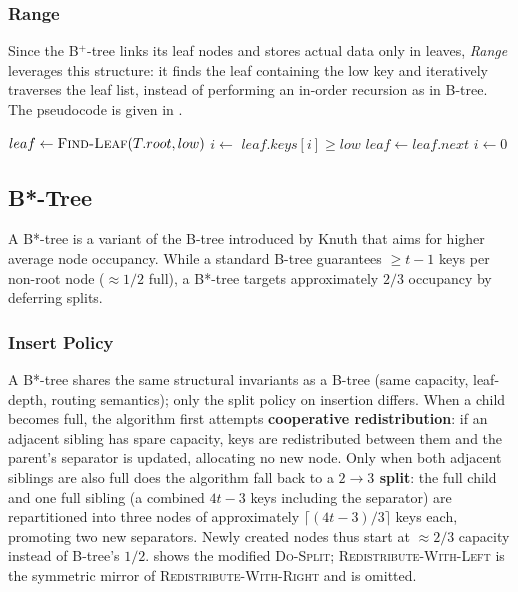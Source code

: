 \documentclass[sigconf]{acmart}
\begin{document}
\subsubsection{Range}

Since the B$^+$-tree links its leaf nodes and stores actual data only in leaves, \textit{Range} leverages this structure: it finds the leaf containing the low key and iteratively traverses the leaf list, instead of performing an in-order recursion as in B-tree. The pseudocode is given in .

\begin{algorithm}[tbp]
\caption{B+ Tree Range Query}
\label{alg:bplus-range}
\begin{algorithmic}[1]
    \State $leaf \gets \Call{Find-Leaf}{T.root, low}$
    \State $i \gets$  $leaf.keys[i] \ge low$
                \State \Return
            \EndIf
            \State {}
        \EndFor
        \State $leaf \gets leaf.next$
        \State $i \gets 0$
    \EndWhile
\EndProcedure
\end{algorithmic}
\end{algorithm}


\subsection{B*-Tree}
A B*-tree is a variant of the B-tree introduced by Knuth\cite{knuth1998} that aims for higher average node occupancy. 
While a standard B-tree guarantees $\ge t-1$ keys per non-root node ($\approx 1/2$ full), a B*-tree targets approximately $2/3$ occupancy by deferring splits.

\subsubsection{Insert Policy}
A B*-tree shares the same structural invariants as a B-tree (same capacity, leaf-depth, routing semantics); only the split policy on insertion differs. 
When a child becomes full, the algorithm first attempts \textbf{cooperative redistribution}: if an adjacent sibling has spare capacity, keys are redistributed between them and the parent's separator is updated, allocating no new node. Only when both adjacent siblings are also full does the algorithm fall back to a \textbf{$2 \to 3$ split}: the full child and one full sibling (a combined $4t - 3$ keys including the separator) are repartitioned into three nodes of approximately $\lceil (4t-3)/3 \rceil$ keys each, promoting two new separators. 
Newly created nodes thus start at $\approx 2/3$ capacity instead of B-tree's $1/2$.  shows the modified \textsc{Do-Split}; \textsc{Redistribute-With-Left} is the symmetric mirror of \textsc{Redistribute-With-Right} and is omitted.
\end{document}
